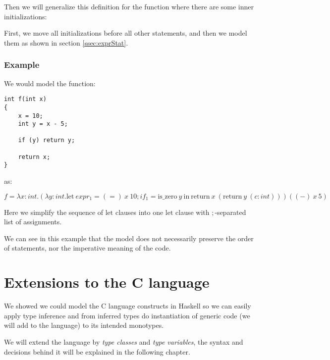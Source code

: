 Then we will generalize this definition for the function where there are some inner initializations:

First, we move all initializations before all other statements, and then we model them as shown in section \ref{ssec:exprStat}.

\subsubsection{Example}

We would model the function:

\begin{lstlisting}
int f(int x)
{
    x = 10;
    int y = x - 5;

    if (y) return y;

    return x;
}
\end{lstlisting}

as:

$f = \lambda x : int . (\lambda y : int . \text{let}\ expr_1 = (=)\ x\ 10; if_1 = \text{is\_zero}\ y\ \text{in}\ \text{return}\ x\ (\text{return}\ y\ (c : int))) ((-)\ x\ 5)$

Here we simplify the sequence of $\text{let}$ clauses into one $\text{let}$ clause with $;$-separated list of assignments.

We can see in this example that the model does not necessarily preserve the order of statements, nor the imperative meaning of the code.

\section{Extensions to the C language}

We showed we could model the C language constructs in Haskell so we can easily apply type inference and from inferred types do instantiation of generic code (we will add to the language) to its intended monotypes.

We will extend the language by \emph{type classes} and \emph{type variables}, the syntax and decisions behind it will be explained in the following chapter.
